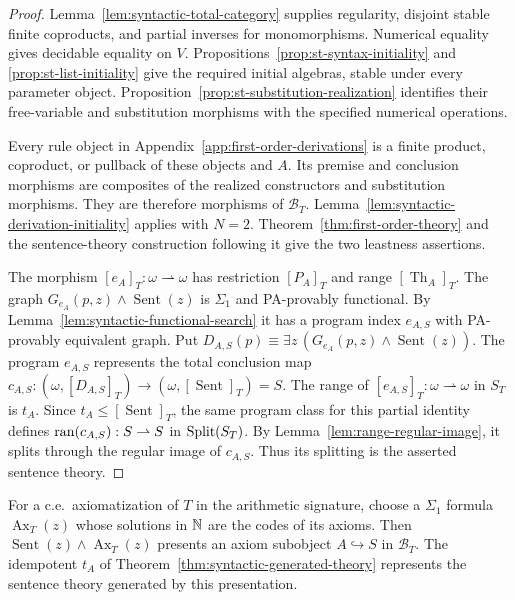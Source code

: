 \begin{proof}
Lemma~\ref{lem:syntactic-total-category} supplies regularity,
disjoint stable finite coproducts, and partial inverses for
monomorphisms. Numerical equality gives decidable equality on $V$.
Propositions~\ref{prop:st-syntax-initiality} and
\ref{prop:st-list-initiality} give the required initial algebras,
stable under every parameter object.
Proposition~\ref{prop:st-substitution-realization} identifies
their free-variable and substitution morphisms with the specified
numerical operations.

Every rule object in Appendix~\ref{app:first-order-derivations}
is a finite product, coproduct, or pullback of these objects and
$A$. Its premise and conclusion morphisms are composites of the
realized constructors and substitution morphisms. They are
therefore morphisms of $\mathcal B_T$.
Lemma~\ref{lem:syntactic-derivation-initiality} applies with $N=2$.
Theorem~\ref{thm:first-order-theory} and the sentence-theory
construction following it give the two leastness assertions.

The morphism $[e_A]_T:\omega\rightharpoonup\omega$
has restriction $[P_A]_T$ and range $[\operatorname{Th}_A]_T$.
The graph $G_{e_A}(p,z)\land\operatorname{Sent}(z)$
is $\Sigma_1$ and PA-provably functional. By
Lemma~\ref{lem:syntactic-functional-search} it has a program
index $e_{A,S}$ with PA-provably equivalent graph.
Put $D_{A,S}(p)\equiv\exists z\,
(G_{e_A}(p,z)\land\operatorname{Sent}(z))$.
The program $e_{A,S}$ represents the total conclusion map
$c_{A,S}:(\omega,[D_{A,S}]_T)\to
(\omega,[\operatorname{Sent}]_T)=S$.
The range of $[e_{A,S}]_T:\omega\rightharpoonup\omega$ in $S_T$ is $t_A$.
Since $t_A\leq[\operatorname{Sent}]_T$, the same program class
for this partial identity defines $\operatorname{ran}(c_{A,S}):S\rightharpoonup S$
in $\operatorname{Split}(S_T)$. By Lemma~\ref{lem:range-regular-image}, it
splits through the regular image of $c_{A,S}$.
Thus its splitting is the asserted sentence theory.
\end{proof}

For a c.e.\ axiomatization of $T$ in the arithmetic signature, choose
a $\Sigma_1$ formula $\operatorname{Ax}_T(z)$ whose solutions in
$\mathbb N$ are the codes of its axioms. Then
$\operatorname{Sent}(z)\land\operatorname{Ax}_T(z)$ presents an
axiom subobject $A\hookrightarrow S$ in $\mathcal B_T$.
The idempotent $t_A$ of Theorem~\ref{thm:syntactic-generated-theory}
represents the sentence theory generated by this presentation.

